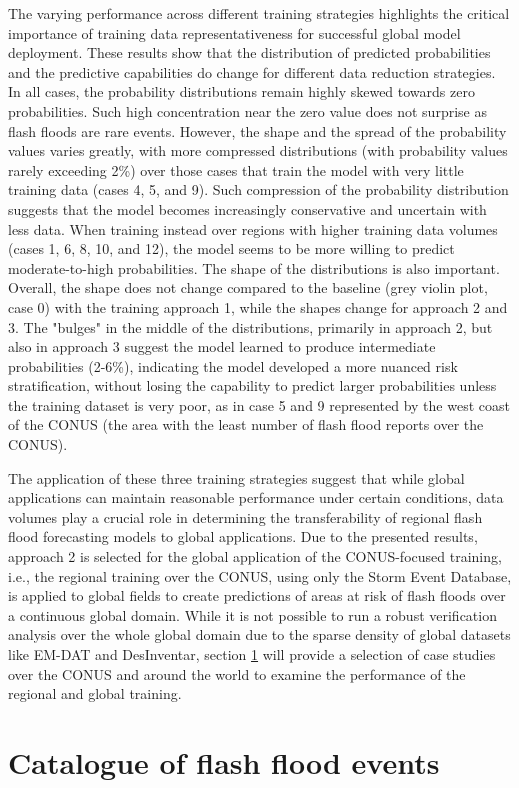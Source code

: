 The varying performance across different training strategies highlights the critical importance of training data representativeness for successful global model deployment. These results show that the distribution of predicted probabilities and the predictive capabilities do change for different data reduction strategies. In all cases, the probability distributions remain highly skewed towards zero probabilities. Such high concentration near the zero value does not surprise as flash floods are rare events. However, the shape and the spread of the probability values varies greatly, with more compressed distributions (with probability values rarely exceeding 2\%) over those cases that train the model with very little training data (cases 4, 5, and 9). Such compression of the probability distribution suggests that the model becomes increasingly conservative and uncertain with less data. When training instead over regions with higher training data volumes (cases 1, 6, 8, 10, and 12), the model seems to be more willing to predict moderate-to-high probabilities. The shape of the distributions is also important. Overall, the shape does not change compared to the baseline (grey violin plot, case 0) with the training approach 1, while the shapes change for approach 2 and 3. The "bulges" in the middle of the distributions, primarily in approach 2, but also in approach 3 suggest the model learned to produce intermediate probabilities (2-6\%), indicating the model developed a more nuanced risk stratification, without losing the capability to predict larger probabilities unless the training dataset is very poor, as in case 5 and 9 represented by the west coast of the CONUS (the area with the least number of flash flood reports over the CONUS). 

The application of these three training strategies suggest that while global applications can maintain reasonable performance under certain conditions, data volumes play a crucial role in determining the transferability of regional flash flood forecasting models to global applications. Due to the presented results, approach 2 is selected for the global application of the CONUS-focused training, i.e., the regional training over the CONUS, using only the Storm Event Database, is applied to global fields to create predictions of areas at risk of flash floods over a continuous global domain. While it is not possible to run a robust verification analysis over the whole global domain due to the sparse density of global datasets like EM-DAT and DesInventar, section \ref{verif_case_study} will provide a selection of case studies over the CONUS and around the world to examine the performance of the regional and global training.


\section{Catalogue of flash flood events}
\label{verif_case_study}